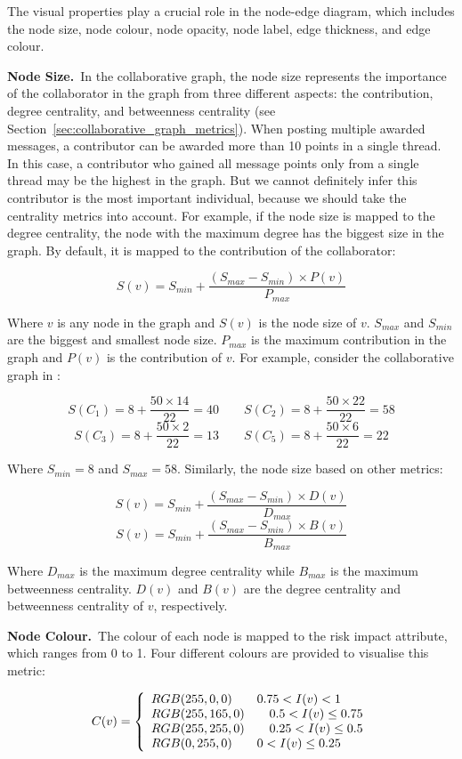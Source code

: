 The visual properties play a crucial role in the node-edge diagram, which includes the node size, node colour, node opacity, node label, edge thickness, and edge colour.

\textbf{Node Size.}~In the collaborative graph, the node size represents the importance of the collaborator in the graph from three different aspects: the contribution, degree centrality, and betweenness centrality (see Section~\ref{sec:collaborative_graph_metrics}). When posting multiple awarded messages, a contributor can be awarded more than 10 points in a single thread. In this case, a contributor who gained all message points only from a single thread may be the highest in the graph. But we cannot definitely infer this contributor is the most important individual, because we should take the centrality metrics into account. For example, if the node size is mapped to the degree centrality, the node with the maximum degree has the biggest size in the graph. By default, it is mapped to the contribution of the collaborator:

\[S(v)=S_{min} + \frac{(S_{max} - S_{min}) \times P(v)}{P_{max}}\]

Where \(v\) is any node in the graph and \(S(v)\) is the node size of \(v\). \(S_{max}\) and \(S_{min}\) are the biggest and smallest node size. \(P_{max}\) is the maximum contribution in the graph and \(P(v)\) is the contribution of \(v\). For example, consider the collaborative graph in :

\[S(C_{1})=8 + \frac{50 \times 14}{22}=40 \quad \quad S(C_{2})=8 + \frac{50 \times 22}{22}=58\]
\[S(C_{3})=8 + \frac{50 \times 2}{22}=13 \quad \quad S(C_{5})=8 + \frac{50 \times 6}{22}=22\]

Where \(S_{min} = 8\) and \(S_{max} = 58\). Similarly, the node size based on other metrics:

\[S(v)=S_{min} + \frac{(S_{max} - S_{min}) \times D(v)}{D_{max}}\]
\[S(v)=S_{min} + \frac{(S_{max} - S_{min}) \times B(v)}{B_{max}}\]

Where \(D_{max}\) is the maximum degree centrality while \(B_{max}\) is the maximum betweenness centrality. \(D(v)\) and \(B(v)\) are the degree centrality and betweenness centrality of \(v\), respectively.

\textbf{Node Colour.}~The colour of each node is mapped to the risk impact attribute, which ranges from 0 to 1. Four different colours are provided to visualise this metric:

\[C(v) = \left\{\begin{array}{l l}
    RGB(255,0,0) \quad \quad 0.75 < I(v) < 1\\
    RGB(255,165,0) \quad \quad 0.5 < I(v) \leq 0.75\\
    RGB(255,255,0) \quad \quad 0.25 < I(v) \leq 0.5\\
    RGB(0,255,0) \quad \quad 0 < I(v) \leq 0.25
  \end{array} \right.
\]

